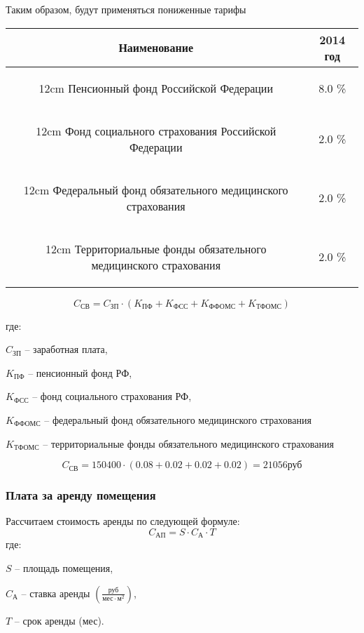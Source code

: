 \newpage

Таким образом, будут применяться пониженные тарифы

\newcommand{\tp}[2]%
{
    \begin{tabpage}{#2}
    #1
    \end{tabpage}
}

\vspace{1em}

\begin{tabular}{|c|c|}
\hline
Наименование & 2014 год \\
\hline
\tp{Пенсионный фонд Российской Федерации}{12cm} & 8.0 \% \\
\hline
\tp{Фонд социального страхования Российской Федерации}{12cm} & 2.0 \% \\
\hline
\tp{Федеральный фонд обязательного медицинского страхования}{12cm} & 2.0 \% \\
\hline
\tp{Территориальные фонды обязательного медицинского страхования}{12cm} & 2.0 \% \\
\hline
\end{tabular}

$$C_\text{СВ} = C_\text{ЗП} \cdot ( K_\text{ПФ} + K_\text{ФСС} +
K_\text{ФФОМС} + K_\text{ТФОМС} )$$

где:

$C_\text{ЗП}$ -- заработная плата,

$K_\text{ПФ}$ -- пенсионный фонд РФ,

$K_\text{ФСС}$ -- фонд социального страхования РФ,

$K_\text{ФФОМС}$ -- федеральный фонд обязательного медицинского страхования

$K_\text{ТФОМС}$ -- территориальные фонды обязательного медицинского страхования

$$C_\text{СВ} = 150400 \cdot ( 0.08 + 0.02 + 0.02 + 0.02 ) = 21056 \text{руб}$$

\subsubsection{Плата за аренду помещения}

Рассчитаем стоимость аренды по следующей формуле:
$$ C_\text{АП} = S \cdot C_\text{А} \cdot T $$
где:

$S$ -- площадь помещения,

$C_\text{А}$ -- ставка аренды $\left(\frac{\text{руб}}{\text{мес}\cdot\text{м}^2}\right)$,

$T$ -- срок аренды (мес).

